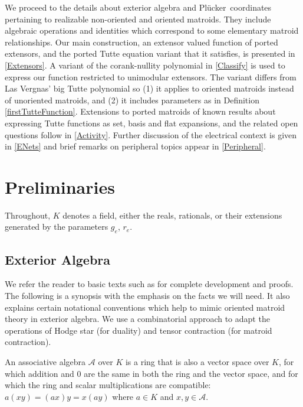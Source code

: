 \documentclass[12pt]{article}
\theoremstyle{definition}
\newcommand{\FieldK}{\ensuremath{K}}
\newcommand{\Plucker}{Pl\"{u}cker\ }
\begin{document}
We proceed to the details about exterior algebra and
\Plucker coordinates pertaining to
realizable non-oriented and oriented matroids.  They include
algebraic operations and identities which correspond to some elementary
matroid relationships.  Our main construction, an extensor valued function
of ported extensors, and the ported Tutte equation variant that it
satisfies, is presented in \textsection \ref{Extensors}.
A variant of the corank-nullity polynomial in \textsection
\ref{Classify} is used to express our function restricted
to unimodular extensors.  The variant differs from
Las Vergnas' big Tutte polynomial 
so (1) it
applies to oriented matroids instead of unoriented matroids, and
(2) it includes parameters as in Definition \ref{firstTutteFunction}.
Extensions to ported matroids of known results
about expressing Tutte functions as set, basis and flat
expansions, and the related open questions follow 
in \textsection \ref{Activity}.
Further discussion of the electrical 
context is 
given in \textsection \ref{ENets}
and brief remarks on peripheral topics appear in
\textsection \ref{Peripheral}.

\section{Preliminaries}
\label{Preliminaries}

Throughout, $\FieldK$ denotes a field, either the 
reals, rationals, or their extensions generated by
the parameters $g_e$, $r_e$.

\subsection{Exterior Algebra}
\label{ExteriorAlgebraSection}

We refer the reader to basic texts such as 
\cite[-7.2, on associative and exterior algebras over fields]{JacobsonI}
for complete development and proofs.
The following is a synopsis with the emphasis on the
facts we will need.  It also explains certain notational conventions which
help to mimic oriented matroid theory in exterior algebra.  We use 
a combinatorial approach to adapt the operations of Hodge star
(for duality) and tensor contraction (for matroid contraction).

An associative algebra $\mathcal{A}$ over $\FieldK$ is a ring that is also
a vector space over $\FieldK$, for which addition and $0$ are the
same in both the ring and the vector space, and for which the ring
and scalar multiplications are compatible:  $a(xy)=(ax)y=x(ay)$
where $a\in\FieldK$ and $x,y\in \mathcal{A}$.
\end{document}
